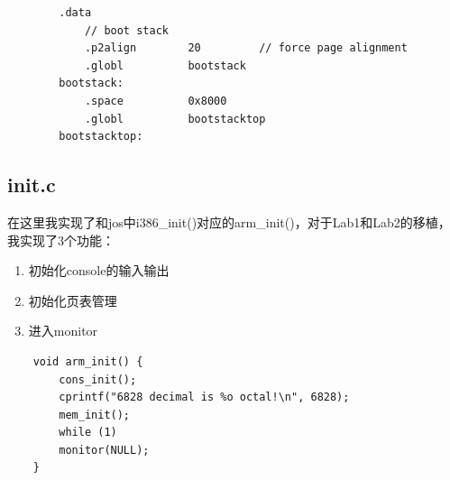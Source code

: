\documentclass[11pt,a4paper]{article}
\begin{document}
\begin{CJK}{UTF8}{gkai}
\begin{lstlisting}
		.data
			// boot stack
			.p2align        20         // force page alignment
			.globl          bootstack
		bootstack:
			.space          0x8000
			.globl          bootstacktop
		bootstacktop:
		\end{lstlisting}
	
	\subsection{init.c}
	在这里我实现了和jos中i386\_init()对应的arm\_init()，对于Lab1和Lab2的移植，我实现了3个功能：
	\begin{enumerate}
		\item 初始化console的输入输出
		\item 初始化页表管理
		\item 进入monitor
	\end{enumerate}
	\begin{lstlisting}
	void arm_init() {
		cons_init();
		cprintf("6828 decimal is %o octal!\n", 6828);
		mem_init();
		while (1)
		monitor(NULL);
	}
	\end{lstlisting}

\end{CJK}
\end{document}
